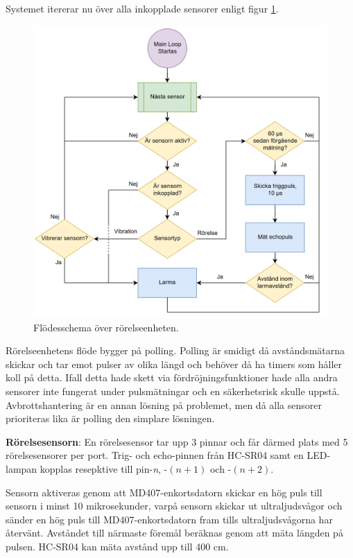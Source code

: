 \documentclass{article}
\begin{document}
Systemet itererar nu över alla inkopplade sensorer enligt figur \ref{fig:MotionFlow}. \newpage


\begin{figure}
\centering
\includegraphics[scale=0.3]{figurer/FlowchartMotion.png}
\caption{Flödesschema över rörelseenheten.}
 \label{fig:MotionFlow}
\end{figure}

Rörelseenhetens flöde bygger på polling. Polling är smidigt då avståndsmätarna skickar och tar emot pulser av olika längd
och behöver då ha timers som håller koll på detta. Ifall detta hade skett via fördröjningsfunktioner hade alla andra sensorer
inte fungerat under pulsmätningar och en säkerhetsrisk skulle uppstå. Avbrottshantering är en annan lösning på problemet,
men då alla sensorer prioriteras lika är polling den simplare lösningen.


\textbf{Rörelsesensorn}:
En rörelsesensor tar upp 3 pinnar och får därmed plats med 5 rörelsesensorer per port.
Trig- och echo-pinnen från HC-SR04 samt en LED-lampan kopplas resepktive till  pin-\textit{n}, -$(n+1)$ och -$(n+2)$.


Sensorn aktiveras genom att MD407-enkortsdatorn skickar en hög puls till sensorn i minst 10 mikrosekunder, 
varpå sensorn skickar ut ultraljudsvågor och sänder en hög puls till MD407-enkortsdatorn fram tills ultraljudsvågorna har återvänt. 
Avståndet till närmaste föremål beräknas genom att mäta längden på pulsen. HC-SR04 kan mäta avstånd upp till 400 cm.
\end{document}
